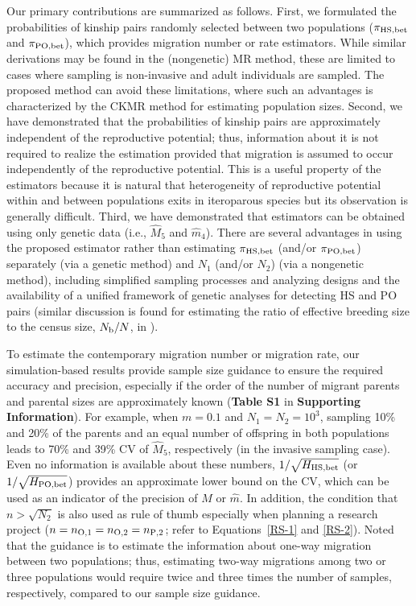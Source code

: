 \documentclass[12pt, English]{article}
\begin{document}
\begin{spacing}{1.9}
Our primary contributions are summarized as follows. First, we formulated the probabilities of kinship pairs randomly selected between two populations ($\pi_{\rm HS,bet}$ and $\pi_{\rm PO,bet}$), which provides migration number or rate estimators. While similar derivations may be found in the (nongenetic) MR method, these are limited to cases where sampling is non-invasive and adult individuals are sampled. The proposed method can avoid these limitations, where such an advantages is characterized by the CKMR method for estimating population sizes. Second, we have demonstrated that the probabilities of kinship pairs are approximately independent of the reproductive potential; thus, information about it is not required to realize the estimation provided that migration is assumed to occur independently of the reproductive potential. This is a useful property of the estimators because it is natural that heterogeneity of reproductive potential within and between populations exits in iteroparous species but its observation is generally difficult. Third, we have demonstrated that estimators can be obtained using only genetic data (i.e., ${\hat M_5}$ and ${\hat m_4}$). There are several advantages in using the proposed estimator rather than estimating $\pi_{\rm HS,bet}$ (and/or $\pi_{\rm PO,bet}$) separately (via a genetic method) and $N_1$ (and/or $N_2$) (via a nongenetic method), including simplified sampling processes and analyzing designs and the availability of a unified framework of genetic analyses for detecting HS and PO pairs (similar discussion is found for estimating the ratio of effective breeding size to the census size, $N_{\rm b}/N$, in \cite{Akita_2020}). 

To estimate the contemporary migration number or migration rate, our simulation-based results provide sample size guidance to ensure the required accuracy and precision, especially if the order of the number of migrant parents and parental sizes are approximately known ({\bf Table S1} in {\bf Supporting Information}). For example, when $m=0.1$ and $N_1=N_2=10^3$, sampling 10\% and 20\% of the parents and an equal number of offspring in both populations leads to 70\% and 39\% CV of ${\hat M_5}$, respectively (in the invasive sampling case). Even no information is available about these numbers, $1/\sqrt{H_{\rm HS, bet}}$ (or $1/\sqrt{H_{\rm PO, bet}}$) provides an approximate lower bound on the CV, which can be used as an indicator of the precision of ${\hat M}$ or ${\hat m}$. In addition, the condition that $n>\sqrt{N_2}$ is also used as rule of thumb especially when planning a research project ($n = n_{\rm O, 1}=n_{\rm O, 2}=n_{\rm P, 2}$; refer to Equations~\ref{RS-1} and \ref{RS-2}). Noted that the guidance is to estimate the information about one-way migration between two populations; thus, estimating two-way migrations among two or three populations would require twice and three times the number of samples, respectively, compared to our sample size guidance. 


\end{spacing}
\end{document}
